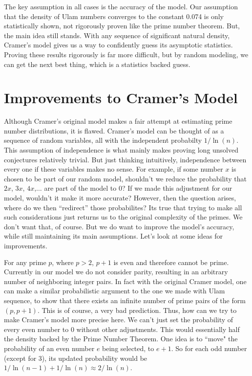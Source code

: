 \documentclass[conference]{IEEEtran}
\begin{document}
The key assumption in all cases is the accuracy of the model. Our assumption that the density of Ulam numbers converges to the constant 0.074 is only statistically shown, not rigorously proven like the prime number theorem. But, the main idea still stands. With any sequence of significant natural density, Cramer's model gives us a way to confidently guess its asymptotic statistics. Proving these results rigorously is far more difficult, but by random modeling, we can get the next best thing, which is a statistics backed guess. 

\section{Improvements to Cramer's Model}

Although Cramer's original model makes a fair attempt at estimating prime number distributions, it is flawed. Cramer's model can be thought of as a sequence of random variables, all with the independent probabilty $1 / \ln(n)$. This assumption of independence is what mainly makes proving long unsolved conjectures relatively trivial. But just thinking intuitively, independence between every one if these variables makes no sense. For example, if some number $x$ is chosen to be part of our random model, shouldn't we reduce the probability that $2x$, $3x$, $4x$,$\dots$ are part of the model to 0? If we made this adjustment for our model, wouldn't it make it more accurate? However, then the question arises, where do we then ``redirect'' those probabilites? Its true that trying to make all such considerations just returns us to the original complexity of the primes. We don't want that, of course. But we do want to improve the model's accuracy, while still maintaining its main assumptions. Let's look at some ideas for improvements. 

For any prime $p$, where $p > 2$, $p + 1$ is even and therefore cannot be prime. Currently in our model we do not consider parity, resulting in an arbitrary number of neighboring integer pairs. In fact with the original Cramer model, one can make a similar probabilistic argument to the one we made with Ulam sequence, to show that there exists an infinite number of prime pairs of the form $(p, p + 1)$. This is of course, a very bad prediction. Thus, how can we try to make Cramer's model more precise here. We can't just set the probability of every even number to 0 without other adjustments. This would essentially half the density backed by the Prime Number Theorem. One idea is to ``move" the probability of an even number $e$ being selected, to $e + 1$. So for each odd number (except for 3), its updated probability would be $1 / \ln(n - 1) + 1 / \ln(n) \approx 2 / \ln(n)$.
\end{document}
